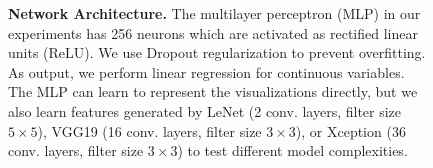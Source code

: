 \begin{figure}[t]
	\centering
	
	\hfill

  \caption{\textbf{Network Architecture.} The multilayer perceptron (MLP) in our experiments has 256 neurons which are activated as rectified linear units (ReLU). We use Dropout regularization to prevent overfitting. As output, we perform linear regression for continuous variables. The MLP can learn to represent the visualizations directly, but we also learn features generated by LeNet (2 conv. layers, filter size $5\times5$), VGG19 (16 conv. layers, filter size $3\times3$), or Xception (36 conv. layers, filter size $3\times3$) to test different model complexities.}
	\label{fig:classifiers}
\end{figure}

